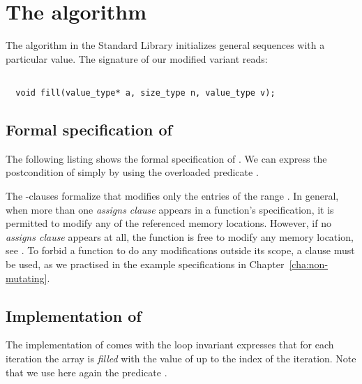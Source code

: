 
\section{The \filli algorithm}

The \filli  algorithm in the \cxx
Standard Library \cite[\S 28.6.6]{cxx-17-draft} initializes general
sequences with a particular value.
The signature of our modified variant reads:

\begin{lstlisting}[style=acsl-block]

  void fill(value_type* a, size_type n, value_type v);
\end{lstlisting}

\subsection{Formal specification of \filli}

The following listing shows the formal specification of .
We can express the postcondition of \filli simply by using the overloaded
predicate .



The -clauses formalize that \filli modifies only the
entries of the range .
In general, when more than one \emph{assigns clause} appears
in a function's specification,
it is permitted to modify any of the referenced memory locations.
However, if no \emph{assigns clause} appears at all,
the function is free to modify any memory location, see
\cite[\S 2.3.2]{ACSLSpec}.
To forbid a function to do any modifications outside its
scope, a clause 
must be used, as we practised
in the example specifications in Chapter~\ref{cha:non-mutating}.

\subsection{Implementation of \filli}

The implementation of  comes with the loop invariant
 expresses that for each iteration the array is
\emph{filled} with the value of  up to the index  of the iteration. 
Note that we use here again the predicate .




